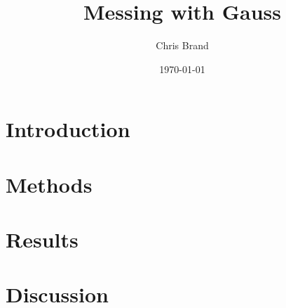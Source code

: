 \documentclass[11pt]{article}
\title{Messing with Gauss}
\author{Chris Brand}
\date{\today}
\begin{document}
\maketitle

\section{Introduction}
\label{sec:intro}


\section{Methods}
\label{sec:meth}


\section{Results}
\label{sec:res}


\section{Discussion}
\label{sec:disc}




\end{document}
